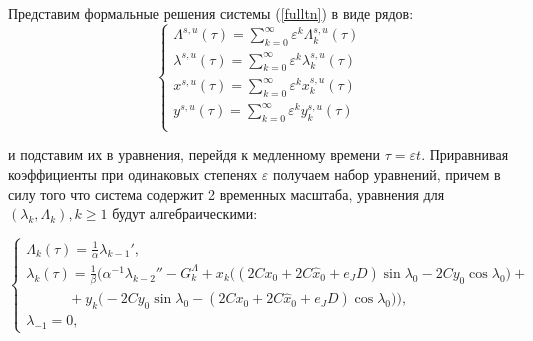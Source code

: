     Представим формальные решения системы (\ref{fulltn}) в виде рядов:
    \begin{equation}
    \begin{cases}
\Lambda^{s,u}(\tau) = \sum_{k=0}^\infty \varepsilon^k \Lambda^{s,u}_k(\tau)\\
\lambda^{s,u}(\tau) = \sum_{k=0}^\infty \varepsilon^k \lambda^{s,u}_k(\tau)\\
x^{s,u}(\tau) =       \sum_{k=0}^\infty \varepsilon^k x^{s,u}_k(\tau)\\
y^{s,u}(\tau) =       \sum_{k=0}^\infty \varepsilon^k y^{s,u}_k(\tau)\\
\end{cases}
    \label{predst}
\end{equation}


    и подставим их в уравнения, перейдя к медленному времени $\tau=\varepsilon t$.
    Приравнивая коэффициенты при одинаковых степенях $\varepsilon$ получаем набор уравнений, причем в силу того что система содержит 2 временных масштаба, уравнения для $(\lambda_k, \Lambda_k), k \ge 1$ будут алгебраическими:

\begin{equation}
    \begin{cases}
        \Lambda_k(\tau) = \frac{1}{\alpha} \lambda_{k-1}', \\
        
        \lambda_k(\tau) = \frac1\beta \Big( \alpha^{-1} \lambda_{k-2}'' - G_k^\Lambda + x_k \big( (2Cx_0+2C \hat x_0+e_JD) \sin\lambda_0 - 2Cy_0 \cos\lambda_0 \big) + \\
        
        \quad \quad \quad +y_k \big( -2Cy_0 \sin\lambda_0 - (2Cx_0+2C \hat x_0+e_JD) \cos\lambda_0 \big) \Big),\\
        \lambda_{-1}=0,
    \end{cases}
\end{equation}

